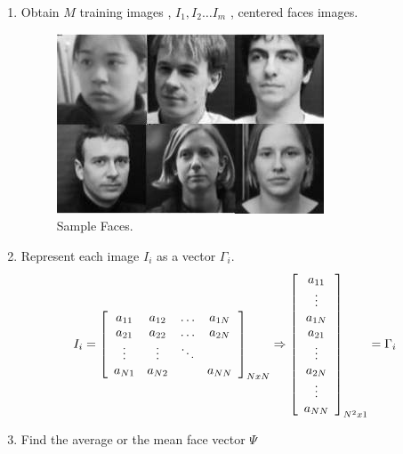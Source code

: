 \documentclass[a4paper,twoside]{article}
\begin{document}
\begin{enumerate}
\item Obtain $M$ training images , $I_1, I_2 \dots I_m$  , centered faces images.

\begin{figure}[h]
 \begin{center}
 \centering
\includegraphics[scale=0.5]{training-images.jpg} \caption{Sample Faces. }
 \end{center}\end{figure}
\item Represent each image $I_i$ as a vector $\Gamma_i$.
\begin{equation}
\label{arrequation}
I_i  = \left[ {\begin{array}{*{20}c} {a_{11} } & {a_{12} } &\ldots& {a_{1N} }  \\
   {a_{21} } & {a_{22} } &  \ldots   & {a_{2N} }  \\
    \vdots  &  \vdots  &  \ddots   & {}  \\
   {a_{N1} } & {a_{N2} }  & {} & {a_{NN} }  \\
\end{array}} \right]_{NxN} \Rightarrow\left[
{\begin{array}{*{20}c}
   {a_{11} }  \\
   {\vdots}  \\
    {a_{1N} }  \\
     {a_{21}}  \\
        {\vdots}  \\
   {a_{2N} }  \\
   {\vdots}  \\
   {a_{NN} }  \\
\end{array}} \right]_{N^2 x1} = \Gamma _i
\end{equation}
\item Find the average or the mean face vector  $\Psi$


\end{enumerate}
\end{document}
